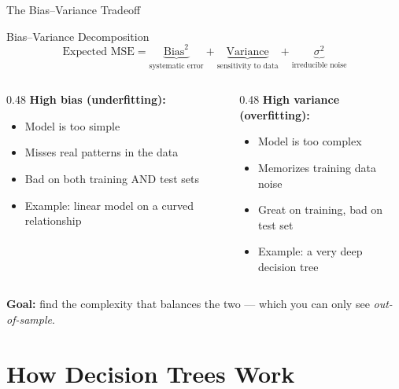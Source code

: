 \documentclass[aspectratio=169, 11pt]{beamer}
\begin{document}
\begin{frame}{The Bias--Variance Tradeoff \parencite{James2021}}
  \begin{definitionbox}{Bias--Variance Decomposition}
    \[
      \text{Expected MSE} = \underbrace{\text{Bias}^2}_{\text{systematic error}}
                           + \underbrace{\text{Variance}}_{\text{sensitivity to data}}
                           + \underbrace{\sigma^2}_{\text{irreducible noise}}
    \]
  \end{definitionbox}
  \begin{columns}[T]
    \begin{column}{0.48\textwidth}
      \textbf{High bias (underfitting):}
      \begin{itemize}\small
        \item Model is too simple
        \item Misses real patterns in the data
        \item Bad on both training AND test sets
        \item Example: linear model on a curved relationship
      \end{itemize}
    \end{column}
    \begin{column}{0.48\textwidth}
      \textbf{High variance (overfitting):}
      \begin{itemize}\small
        \item Model is too complex
        \item Memorizes training data noise
        \item Great on training, bad on test set
        \item Example: a very deep decision tree
      \end{itemize}
    \end{column}
  \end{columns}
  \vspace{0.15cm}
  \textbf{Goal:} find the complexity that balances the two --- which you can
  only see \emph{out-of-sample}.
\end{frame}

\section{How Decision Trees Work}
\end{document}
